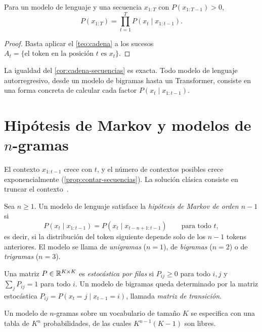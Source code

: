 \begin{corolario}\label{cor:cadena-secuencias}
Para un modelo de lenguaje y una secuencia $x_{1:T}$ con $P(x_{1:T-1})>0$,
\[
P(x_{1:T})=\prod_{t=1}^{T}P(x_t\mid x_{1:t-1}).
\]
\end{corolario}

\begin{proof}
Basta aplicar el \cref{teo:cadena} a los sucesos $A_t=\{\text{el token en la posición } t \text{ es } x_t\}$.
\end{proof}

La igualdad del \cref{cor:cadena-secuencias} es exacta. Todo modelo de lenguaje autorregresivo, desde un modelo de bigramas hasta un Transformer, consiste en una forma concreta de calcular cada factor $P(x_t\mid x_{1:t-1})$.

\section{Hipótesis de Markov y modelos de \texorpdfstring{$n$}{n}-gramas}

El contexto $x_{1:t-1}$ crece con $t$, y el número de contextos posibles crece exponencialmente (\cref{prop:contar-secuencias}). La solución clásica consiste en truncar el contexto~\cite[§3.1.1]{jm3}.

\begin{definicion}\label{def:ngramas}
Sea $n\ge 1$. Un modelo de lenguaje satisface la \emph{hipótesis de Markov de orden $n-1$} si
\[
P(x_t\mid x_{1:t-1})=P(x_t\mid x_{t-n+1:t-1})\qquad\text{para todo } t,
\]
es decir, si la distribución del token siguiente depende solo de los $n-1$ tokens anteriores. El modelo se llama de \emph{unigramas} ($n=1$), de \emph{bigramas} ($n=2$) o de \emph{trigramas} ($n=3$).
\end{definicion}

\begin{definicion}
Una matriz $P\in\mathbb{R}^{K\times K}$ es \emph{estocástica por filas} si $P_{ij}\ge 0$ para todo $i,j$ y $\sum_{j}P_{ij}=1$ para todo $i$. Un modelo de bigramas queda determinado por la matriz estocástica $P_{ij}=P(x_t=j\mid x_{t-1}=i)$, llamada \emph{matriz de transición}.
\end{definicion}

\begin{proposicion}\label{prop:parametros}
Un modelo de $n$-gramas sobre un vocabulario de tamaño $K$ se especifica con una tabla de $K^{n}$ probabilidades, de las cuales $K^{n-1}(K-1)$ son libres.
\end{proposicion}

